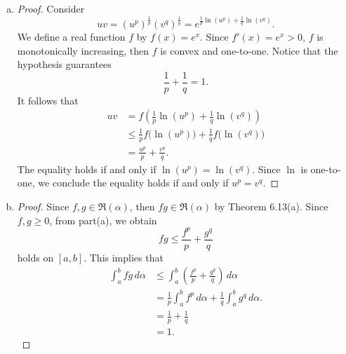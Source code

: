 \begin{Exercise}
	\begin{enumerate}[(a)]
		\item 
		\begin{proof}
			Consider
			$$
			uv = (u^p)^{\frac{1}{p}} (v^q)^{\frac{1}{q}}
			= e^{\frac{1}{p} \ln(u^p) + \frac{1}{q} \ln(v^q)}.
			$$
			We define a real function $f$ by $f(x) = e^x$.
			Since $f'(x) = e^x > 0$, $f$ is monotonically increasing, then $f$ is convex and one-to-one.
			Notice that the hypothesis guarantees
			$$
			\frac{1}{p} + \frac{1}{q} = 1.
			$$
			It follows that
			\begin{align*}
			uv 
			&= f\left(\frac{1}{p} \ln(u^p) + \frac{1}{q} \ln(v^q)\right) \\
			&\leq \frac{1}{p} f\big(\ln(u^p)\big) + \frac{1}{q} f\big(\ln(v^q)\big) \\
			&= \frac{u^p}{p} + \frac{v^q}{q}. 
			\end{align*}
			The equality holds if and only if $\ln(u^p) = \ln(v^q)$.
			Since $\ln$ is one-to-one, we conclude the equality holds if and only if $u^p = v^q$.
		\end{proof}
		
		\item
		\begin{proof}
			Since $f,g\in\mathfrak{R}(\alpha)$, then $fg\in\mathfrak{R}(\alpha)$ by Theorem 6.13(a).
			Since $f,g\geq 0$, from part(a), we obtain
			$$
			fg \leq \frac{f^p}{p}+\frac{g^q}{q}
			$$
			holds on $[a,b]$.
			This implies that
			\begin{align*}
			\int_{a}^{b} fg\, d\alpha
			&\leq \int_{a}^{b} \left( \frac{f^p}{p}+\frac{g^q}{q} \right)\, d\alpha \\
			&= \frac{1}{p} \int_{a}^{b}f^p\, d\alpha + \frac{1}{q} \int_{a}^{b}g^q\, d\alpha. \\
			&= \frac{1}{p} + \frac{1}{q} \\
			&= 1.
			\end{align*}
		\end{proof}
		

\end{enumerate}
\end{Exercise}
